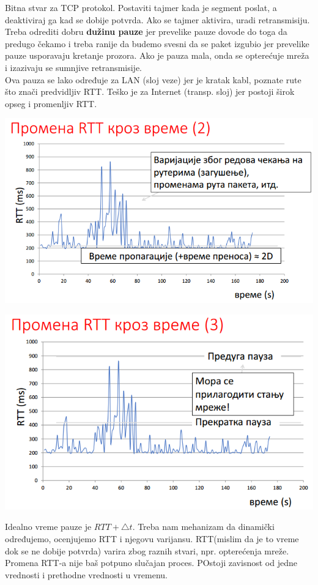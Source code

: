 \documentclass{article} %
\begin{document}
Bitna stvar za TCP protokol. Postaviti tajmer kada je segment poslat, a deaktiviraj ga kad se dobije potvrda. Ako se tajmer aktivira, uradi retransmisiju. Treba odrediti dobru \textbf{dužinu pauze} jer prevelike pauze dovode do toga da predugo čekamo i treba ranije da budemo svesni da se paket izgubio jer prevelike pauze usporavaju kretanje prozora. Ako je pauza mala, onda se opterećuje mreža i izazivaju se sumnjive retransmisije.\\
Ova pauza se lako određuje za LAN (sloj veze) jer je kratak kabl, poznate rute što znači predvidljiv RTT. Teško je za Internet (transp. sloj) jer postoji širok opseg i promenljiv RTT.
 \begin{center}
	\includegraphics[scale=0.5]{retr}
\end{center}
 \begin{center}
	\includegraphics[scale=0.5]{retr2}
\end{center}
Idealno vreme pauze je $RTT+\bigtriangleup t$.
Treba nam mehanizam da dinamički određujemo, ocenjujemo RTT i njegovu varijansu. RTT(mislim da je to vreme dok se ne dobije potvrda) varira zbog raznih stvari, npr. opterećenja mreže. Promena RTT-a nije baš potpuno slučajan proces. POstoji zavisnost od jedne vrednosti i prethodne vrednosti u vremenu.\\
\end{document}
